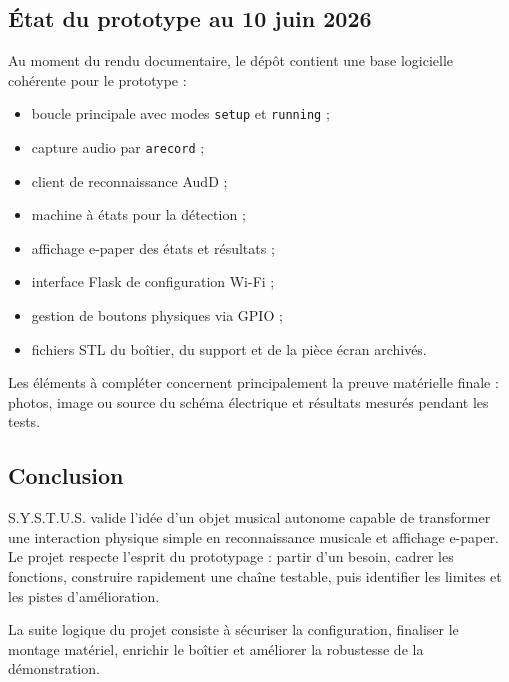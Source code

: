 \subsection{État du prototype au 10 juin 2026}

Au moment du rendu documentaire, le dépôt contient une base logicielle cohérente
pour le prototype :

\begin{itemize}
    \item boucle principale avec modes \texttt{setup} et \texttt{running} ;
    \item capture audio par \texttt{arecord} ;
    \item client de reconnaissance AudD ;
    \item machine à états pour la détection ;
    \item affichage e-paper des états et résultats ;
    \item interface Flask de configuration Wi-Fi ;
    \item gestion de boutons physiques via GPIO ;
    \item fichiers STL du boîtier, du support et de la pièce écran archivés.
\end{itemize}

Les éléments à compléter concernent principalement la preuve matérielle finale :
photos, image ou source du schéma électrique et résultats mesurés pendant les
tests.

\subsection{Conclusion}

S.Y.S.T.U.S. valide l'idée d'un objet musical autonome capable de transformer
une interaction physique simple en reconnaissance musicale et affichage e-paper.
Le projet respecte l'esprit du prototypage : partir d'un besoin, cadrer les
fonctions, construire rapidement une chaîne testable, puis identifier les
limites et les pistes d'amélioration.

La suite logique du projet consiste à sécuriser la configuration, finaliser le
montage matériel, enrichir le boîtier et améliorer la robustesse de la
démonstration.
